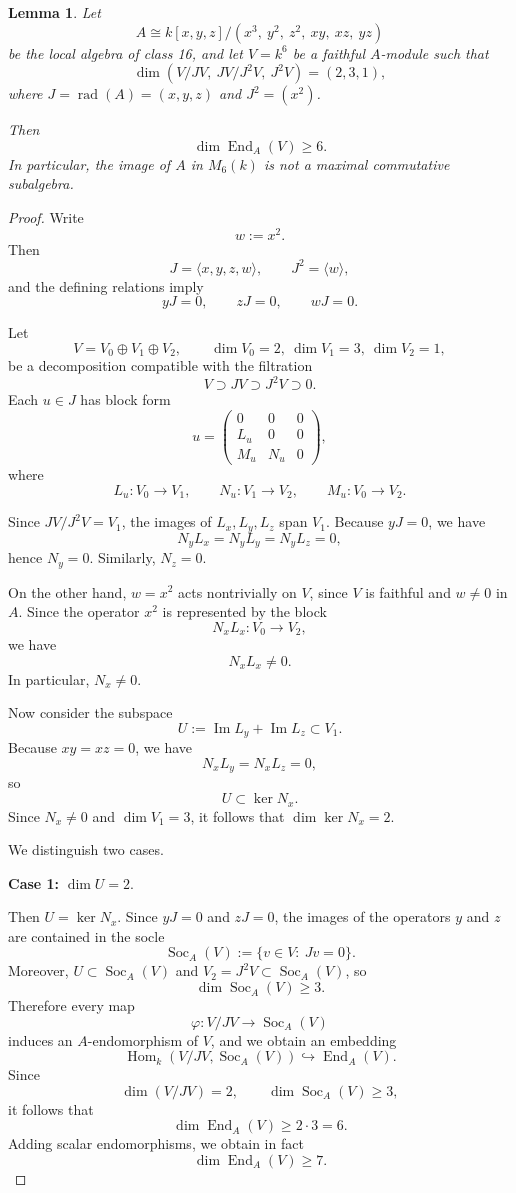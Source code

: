 \documentclass[11pt]{article}
\DeclareMathOperator{\End}{End}
\DeclareMathOperator{\Hom}{Hom}
\DeclareMathOperator{\Soc}{Soc}
\DeclareMathOperator{\rad}{rad}
\theoremstyle{plain}
\newtheorem{lemma}{Lemma}
\theoremstyle{remark}
\begin{document}
\begin{lemma}\label{lem:class16}
	Let
	\[
	A \cong k[x,y,z]/(x^3,\ y^2,\ z^2,\ xy,\ xz,\ yz)
	\]
	be the local algebra of class {\rm 16}, and let $V=k^6$ be a faithful $A$-module such that
	\[
	\dim(V/JV,\ JV/J^2V,\ J^2V)=(2,3,1),
	\]
	where $J=\rad(A)=(x,y,z)$ and $J^2=(x^2)$.
	
	Then
	\[
	\dim \End_A(V)\ge 6.
	\]
	In particular, the image of $A$ in $M_6(k)$ is not a maximal commutative subalgebra.
\end{lemma}

\begin{proof}
	Write
	\[
	w:=x^2.
	\]
	Then
	\[
	J=\langle x,y,z,w\rangle,\qquad J^2=\langle w\rangle,
	\]
	and the defining relations imply
	\[
	yJ=0,\qquad zJ=0,\qquad wJ=0.
	\]
	
	Let
	\[
	V=V_0\oplus V_1\oplus V_2,
	\qquad \dim V_0=2,\ \dim V_1=3,\ \dim V_2=1,
	\]
	be a decomposition compatible with the filtration
	\[
	V\supset JV\supset J^2V\supset 0.
	\]
	Each $u\in J$ has block form
	\[
	u=
	\begin{pmatrix}
		0&0&0\\
		L_u&0&0\\
		M_u&N_u&0
	\end{pmatrix},
	\]
	where
	\[
	L_u:V_0\to V_1,\qquad N_u:V_1\to V_2,\qquad M_u:V_0\to V_2.
	\]
	
	Since $JV/J^2V=V_1$, the images of $L_x,L_y,L_z$ span $V_1$. Because $yJ=0$, we have
	\[
	N_yL_x=N_yL_y=N_yL_z=0,
	\]
	hence $N_y=0$. Similarly, $N_z=0$.
	
	On the other hand, $w=x^2$ acts nontrivially on $V$, since $V$ is faithful and $w\neq 0$ in $A$.
	Since the operator $x^2$ is represented by the block
	\[
	N_xL_x:V_0\to V_2,
	\]
	we have
	\[
	N_xL_x\neq 0.
	\]
	In particular, $N_x\neq 0$.
	
	Now consider the subspace
	\[
	U:=\operatorname{Im}L_y+\operatorname{Im}L_z \subset V_1.
	\]
	Because $xy=xz=0$, we have
	\[
	N_xL_y=N_xL_z=0,
	\]
	so
	\[
	U\subset \ker N_x.
	\]
	Since $N_x\neq 0$ and $\dim V_1=3$, it follows that $\dim\ker N_x=2$.
	
	We distinguish two cases.
	
	\medskip
	\noindent
	\textbf{Case 1:} $\dim U=2$.
	
	Then $U=\ker N_x$. Since $yJ=0$ and $zJ=0$, the images of the operators $y$ and $z$
	are contained in the socle
	\[
	\Soc_A(V):=\{v\in V:\ Jv=0\}.
	\]
	Moreover, $U\subset \Soc_A(V)$ and $V_2=J^2V\subset \Soc_A(V)$, so
	\[
	\dim \Soc_A(V)\ge 3.
	\]
	Therefore every map
	\[
	\varphi:V/JV\to \Soc_A(V)
	\]
	induces an $A$-endomorphism of $V$, and we obtain an embedding
	\[
	\Hom_k(V/JV,\Soc_A(V))\hookrightarrow \End_A(V).
	\]
	Since
	\[
	\dim(V/JV)=2,\qquad \dim\Soc_A(V)\ge 3,
	\]
	it follows that
	\[
	\dim\End_A(V)\ge 2\cdot 3=6.
	\]
	Adding scalar endomorphisms, we obtain in fact
	\[
	\dim\End_A(V)\ge 7.
	\]
	

\end{proof}
\end{document}
